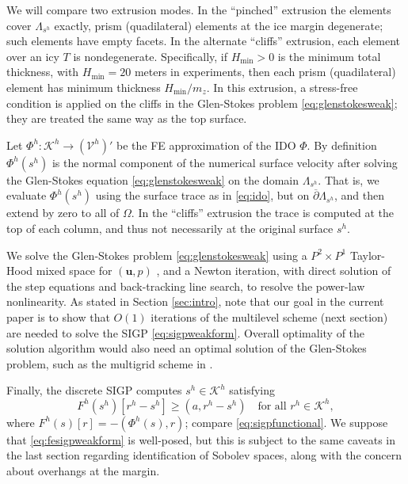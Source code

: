 \documentclass[letterpaper,final,12pt,reqno]{amsart}
\theoremstyle{claim}
\newcommand{\bu}{\mathbf{u}}
\newcommand{\ip}[2]{\left(#1,#2\right)}
\numberwithin{equation}{section}
\numberwithin{figure}{section}
\numberwithin{table}{section}
\numberwithin{theorem}{section}
\begin{document}
We will compare two extrusion modes.  In the ``pinched'' extrusion the elements cover $\Lambda_{s^h}$ exactly, prism (quadilateral) elements at the ice margin degenerate; such elements have empty facets.  In the alternate ``cliffs'' extrusion, each element over an icy $T$ is nondegenerate.  Specifically, if $H_{\text{min}} > 0$ is the minimum total thickness, with $H_{\text{min}} = 20$ meters in experiments, then each prism (quadilateral) element has minimum thickness $H_{\text{min}}/m_z$.  In this extrusion, a stress-free condition is applied on the cliffs  in the Glen-Stokes problem \eqref{eq:glenstokesweak}; they are treated the same way as the top surface.

Let $\Phi^h:\mathcal{K}^h \to (\mathcal{V}^h)'$ be the FE approximation of the IDO $\Phi$.  By definition $\Phi^h(s^h)$ is the normal component of the numerical surface velocity after solving the Glen-Stokes equation \eqref{eq:glenstokesweak} on the domain $\Lambda_{s^h}$.  That is, we evaluate $\Phi^h(s^h)$ using the surface trace as in \eqref{eq:ido}, but on $\overline{\partial} \Lambda_{s^h}$, and then extend by zero to all of $\Omega$.  In the ``cliffs'' extrusion the trace is computed at the top of each column, and thus not necessarily at the original surface $s^h$.

We solve the Glen-Stokes problem \eqref{eq:glenstokesweak} using a $P^2 \times P^1$ Taylor-Hood mixed space for $(\bu,p)$ \cite{Elmanetal2014}, and a Newton iteration, with direct solution of the step equations and back-tracking line search, to resolve the power-law nonlinearity.  As stated in Section \ref{sec:intro}, note that our goal in the current paper is to show that $O(1)$ iterations of the multilevel scheme (next section) are needed to solve the SIGP \eqref{eq:sigpweakform}.  Overall optimality of the solution algorithm would also need an optimal solution of the Glen-Stokes problem, such as the multigrid scheme in \cite{IsaacStadlerGhattas2015}.

Finally, the discrete SIGP computes $s^h \in \mathcal{K}^h$ satisfying
\begin{equation}
F^h(s^h)[r^h - s^h] \ge \ip{a}{r^h-s^h} \quad \text{for all } r^h \in \mathcal{K}^h , \label{eq:fesigpweakform}
\end{equation}
where $F^h(s)[r] = - \ip{\Phi^h(s)}{r}$; compare \eqref{eq:sigpfunctional}.  We suppose that \eqref{eq:fesigpweakform} is well-posed, but this is subject to the same caveats in the last section regarding identification of Sobolev spaces, along with the concern about overhangs at the margin.
\end{document}
